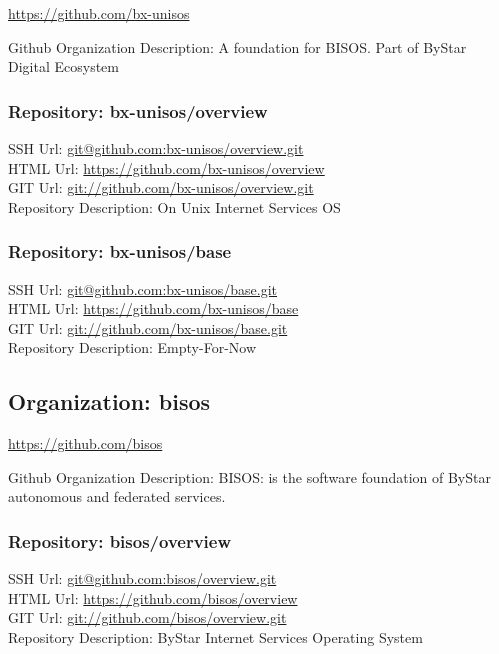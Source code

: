 \url{https://github.com/bx-unisos}

Github Organization Description: A foundation for BISOS. Part of ByStar Digital Ecosystem

\subsubsection{Repository: bx-unisos/overview}

SSH Url:  \url{git@github.com:bx-unisos/overview.git}\\
HTML Url: \url{https://github.com/bx-unisos/overview}\\
GIT Url:  \url{git://github.com/bx-unisos/overview.git}\\


Repository Description: On Unix Internet Services OS

\subsubsection{Repository: bx-unisos/base}

SSH Url:  \url{git@github.com:bx-unisos/base.git}\\
HTML Url: \url{https://github.com/bx-unisos/base}\\
GIT Url:  \url{git://github.com/bx-unisos/base.git}\\


Repository Description: Empty-For-Now

\subsection{Organization: bisos}

\url{https://github.com/bisos}

Github Organization Description: BISOS: is the software foundation of ByStar autonomous and federated services.

\subsubsection{Repository: bisos/overview}

SSH Url:  \url{git@github.com:bisos/overview.git}\\
HTML Url: \url{https://github.com/bisos/overview}\\
GIT Url:  \url{git://github.com/bisos/overview.git}\\


Repository Description: ByStar Internet Services Operating System


